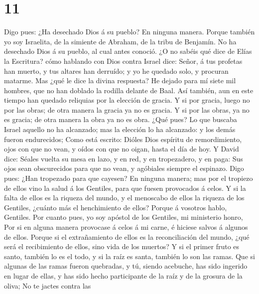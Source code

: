 \hypertarget{section-10}{%
\section{11}\label{section-10}}

 Digo pues: ¿Ha desechado Dios á su pueblo? En ninguna
manera. Porque también yo soy Israelita, de la simiente de Abraham, de
la tribu de Benjamín.  No ha desechado Dios á su pueblo,
al cual antes conoció. ¿O no sabéis qué dice de Elías la Escritura? cómo
hablando con Dios contra Israel dice:  Señor, á tus
profetas han muerto, y tus altares han derruído; y yo he quedado solo, y
procuran matarme.  Mas ¿qué le dice la divina respuesta?
He dejado para mí siete mil hombres, que no han doblado la rodilla
delante de Baal.  Así también, aun en este tiempo han
quedado reliquias por la elección de gracia.  Y si por
gracia, luego no por las obras; de otra manera la gracia ya no es
gracia. Y si por las obras, ya no es gracia; de otra manera la obra ya
no es obra.  ¿Qué pues? Lo que buscaba Israel aquello no
ha alcanzado; mas la elección lo ha alcanzado: y los demás fueron
endurecidos;  Como está escrito: Dióles Dios espíritu de
remordimiento, ojos con que no vean, y oídos con que no oigan, hasta el
día de hoy.  Y David dice: Séales vuelta su mesa en lazo,
y en red, y en tropezadero, y en paga:  Sus ojos sean
obscurecidos para que no vean, y agóbiales siempre el espinazo.
 Digo pues: ¿Han tropezado para que cayesen? En ninguna
manera; mas por el tropiezo de ellos vino la salud á los Gentiles, para
que fuesen provocados á celos.  Y si la falta de ellos es
la riqueza del mundo, y el menoscabo de ellos la riqueza de los
Gentiles, ¿cuánto más el henchimiento de ellos?  Porque á
vosotros hablo, Gentiles. Por cuanto pues, yo soy apóstol de los
Gentiles, mi ministerio honro,  Por si en alguna manera
provocase á celos á mi carne, é hiciese salvos á algunos de ellos.
 Porque si el extrañamiento de ellos es la reconciliación
del mundo, ¿qué será el recibimiento de ellos, sino vida de los muertos?
 Y si el primer fruto es santo, también lo es el todo, y
si la raíz es santa, también lo son las ramas.  Que si
algunas de las ramas fueron quebradas, y tú, siendo acebuche, has sido
ingerido en lugar de ellas, y has sido hecho participante de la raíz y
de la grosura de la oliva;  No te jactes contra las
